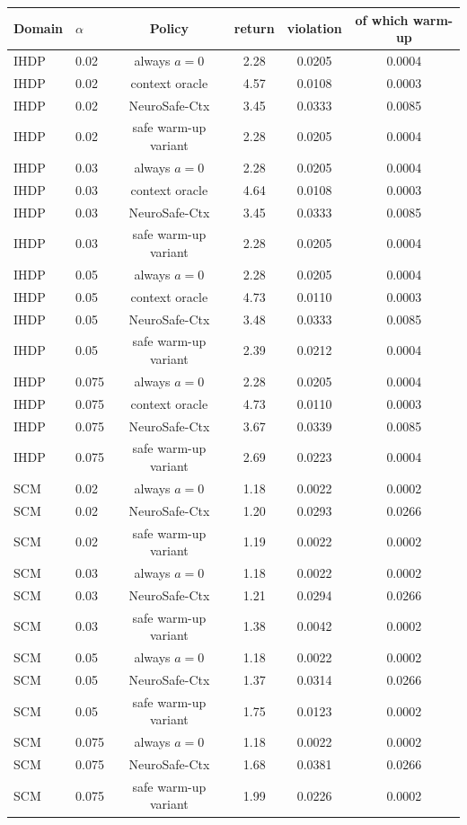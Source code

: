 \begin{tabular}{llcccc}
\toprule
Domain & $\alpha$ & Policy & return & violation & of which warm-up \\
\midrule
IHDP & 0.02 & always $a=0$ & 2.28 & 0.0205 & 0.0004 \\
IHDP & 0.02 & context oracle & 4.57 & 0.0108 & 0.0003 \\
IHDP & 0.02 & NeuroSafe-Ctx & 3.45 & 0.0333 & 0.0085 \\
IHDP & 0.02 & safe warm-up variant & 2.28 & 0.0205 & 0.0004 \\
IHDP & 0.03 & always $a=0$ & 2.28 & 0.0205 & 0.0004 \\
IHDP & 0.03 & context oracle & 4.64 & 0.0108 & 0.0003 \\
IHDP & 0.03 & NeuroSafe-Ctx & 3.45 & 0.0333 & 0.0085 \\
IHDP & 0.03 & safe warm-up variant & 2.28 & 0.0205 & 0.0004 \\
IHDP & 0.05 & always $a=0$ & 2.28 & 0.0205 & 0.0004 \\
IHDP & 0.05 & context oracle & 4.73 & 0.0110 & 0.0003 \\
IHDP & 0.05 & NeuroSafe-Ctx & 3.48 & 0.0333 & 0.0085 \\
IHDP & 0.05 & safe warm-up variant & 2.39 & 0.0212 & 0.0004 \\
IHDP & 0.075 & always $a=0$ & 2.28 & 0.0205 & 0.0004 \\
IHDP & 0.075 & context oracle & 4.73 & 0.0110 & 0.0003 \\
IHDP & 0.075 & NeuroSafe-Ctx & 3.67 & 0.0339 & 0.0085 \\
IHDP & 0.075 & safe warm-up variant & 2.69 & 0.0223 & 0.0004 \\
SCM & 0.02 & always $a=0$ & 1.18 & 0.0022 & 0.0002 \\
SCM & 0.02 & NeuroSafe-Ctx & 1.20 & 0.0293 & 0.0266 \\
SCM & 0.02 & safe warm-up variant & 1.19 & 0.0022 & 0.0002 \\
SCM & 0.03 & always $a=0$ & 1.18 & 0.0022 & 0.0002 \\
SCM & 0.03 & NeuroSafe-Ctx & 1.21 & 0.0294 & 0.0266 \\
SCM & 0.03 & safe warm-up variant & 1.38 & 0.0042 & 0.0002 \\
SCM & 0.05 & always $a=0$ & 1.18 & 0.0022 & 0.0002 \\
SCM & 0.05 & NeuroSafe-Ctx & 1.37 & 0.0314 & 0.0266 \\
SCM & 0.05 & safe warm-up variant & 1.75 & 0.0123 & 0.0002 \\
SCM & 0.075 & always $a=0$ & 1.18 & 0.0022 & 0.0002 \\
SCM & 0.075 & NeuroSafe-Ctx & 1.68 & 0.0381 & 0.0266 \\
SCM & 0.075 & safe warm-up variant & 1.99 & 0.0226 & 0.0002 \\
\bottomrule
\end{tabular}
